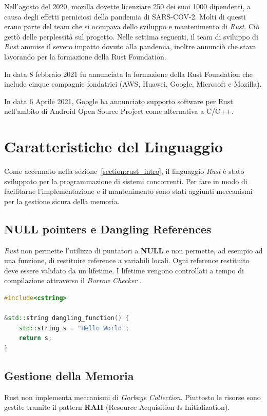 Nell'agosto del 2020, mozilla dovette licenziare 250 dei suoi 1000 dipendenti, a causa degli effetti perniciosi della pandemia di SARS-COV-2. Molti di questi erano parte del team che si occupava dello sviluppo e mantenimento di \textit{Rust}. Ciò gettò delle perplessità sul progetto.
Nelle settima seguenti, il team di sviluppo di \textit{Rust} ammise il severo impatto dovuto alla pandemia, inoltre annunciò che stava lavorando per la formazione della Rust Foundation\cite{rust_is_in_trouble}.

In data 8 febbraio 2021 fu annunciata la formazione della Rust Foundation che include cinque compagnie fondatrici (AWS, Huawei, Google, Microsoft e Mozilla).

In data 6 Aprile 2021, Google ha annunciato supporto software per Rust nell'ambito di Android Open Source Project come alternativa a C/C++.

\section{Caratteristiche del Linguaggio}
Come accennato nella sezione~\ref{section:rust_intro}, il linguaggio \textit{Rust} è stato sviluppato per la programmazione di sistemi concorrenti. Per fare in modo di facilitarne l'implementazione e il mantenimento sono stati aggiunti meccanismi per la gestione sicura della memoria.

\clearpage

\subsection{NULL pointers e Dangling References}

\textit{Rust} non permette l'utilizzo di puntatori a \textbf{NULL} e non permette, ad esempio ad una funzione, di restituire reference a variabili locali. Ogni reference restituito deve essere validato da un lifetime. I lifetime vengono controllati a tempo di compilazione attraverso il \textit{Borrow Checker} \cite{10.5555/3271463}.\\

\begin{lstlisting}[language=C++, caption={Esempio di dangling reference C++}, captionpos=b]
#include<cstring>

&std::string dangling_function() {
    std::string s = "Hello World";
    return s;
}
\end{lstlisting}

\subsection{Gestione della Memoria}
Rust non implementa meccanismi di \textit{Garbage Collection}. Piuttosto le risorse sono gestite tramite il pattern \textbf{RAII} (Resource Acquisition Is Initialization).

